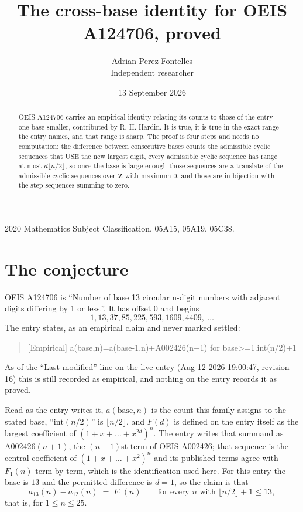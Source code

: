 \documentclass[11pt,a4paper]{article}
\title{The cross-base identity for OEIS A124706, proved}
\author{Adrian Perez Fontelles\\ \small Independent researcher}
\date{13 September 2026}
\theoremstyle{plain}
\theoremstyle{definition}
\begin{document}
\maketitle

\begin{abstract}
OEIS A124706 carries an empirical identity relating its counts to those of the entry one base
smaller, contributed by R. H. Hardin. It is true, it is true in the exact range the entry
names, and that range is sharp. The proof is four steps and needs no computation: the
difference between consecutive bases counts the admissible cyclic sequences that USE the new
largest digit, every admissible cyclic sequence has range at most $d\lfloor n/2\rfloor$, so
once the base is large enough those sequences are a translate of the admissible cyclic
sequences over $\mathbf{Z}$ with maximum $0$, and those are in bijection with the step
sequences summing to zero.
\end{abstract}

\noindent\small 2020 Mathematics Subject Classification. 05A15, 05A19, 05C38.\normalsize

\section{The conjecture}

OEIS A124706 is ``Number of base 13 circular n-digit numbers with adjacent digits differing by 1 or less.''. It has offset $0$ and begins
\[
1, 13, 37, 85, 225, 593, 1609, 4409,\ \dots
\]
The entry states, as an empirical claim and never marked settled:
\begin{quote}
[Empirical] a(base,n)=a(base-1,n)+A002426(n+1) for base>=1.int(n/2)+1
\end{quote}
As of the ``Last modified'' line on the live entry (Aug 12 2026 19:00:47, revision 16)
this is still recorded as empirical, and nothing on the entry records it as proved.

Read as the entry writes it, $a(\mathrm{base},n)$ is the count this family assigns to the
stated base, ``$\mathrm{int}(n/2)$'' is $\lfloor n/2\rfloor$, and $F(d)$ is defined on the
entry itself as the largest coefficient of $(1+x+\dots+x^{2d})^{n}$. The entry writes that summand as $\mathrm{A002426}(n+1)$, the $(n+1)$st term of OEIS A002426; that sequence is the central coefficient of $(1+x+\dots+x^{2})^{n}$ and its published terms agree with $F_{1}(n)$ term by term, which is the identification used here. For this entry
the base is $13$ and the permitted difference is $d=1$, so the claim is that
\[
a_{13}(n)-a_{12}(n)\;=\;F_{1}(n)
\qquad\text{for every } n \text{ with } \lfloor n/2\rfloor+1\le13,
\]
that is, for $1\le n\le25$.
\end{document}
